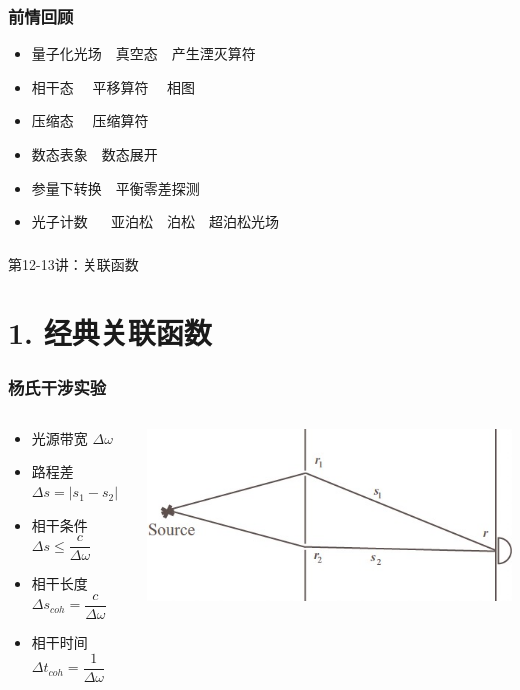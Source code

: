 \begin{frame}
    \frametitle{前情回顾}
    \begin{itemize}
        \item 量子化光场~~真空态~~产生湮灭算符 
        \item 相干态~~ 平移算符 ~~相图
        \item 压缩态~~ 压缩算符
        \item 数态表象~~数态展开
        \item 参量下转换~~平衡零差探测 
        \item 光子计数 ~~ 亚泊松~~泊松~~超泊松光场 
    \end{itemize}     
\end{frame}

\begin{frame} [plain]
    \frametitle{}
    \Background[1] 
    \begin{center}
    {\huge 第12-13讲：关联函数}
    \end{center}  
    \addtocounter{framenumber}{-1}   
\end{frame}

\section{1. 经典关联函数}
\begin{frame} 
    \frametitle{杨氏干涉实验}
    \begin{columns}
    \begin{column}[t]{0.4\linewidth}
    \begin{itemize}
        \item 光源带宽 $\Delta \omega $  
        \item 路程差 $\Delta s = |s_1 - s_2|$ 
        \item 相干条件 $\Delta s \le \dfrac{c}{\Delta \omega}$ 
        \item 相干长度 $\Delta s_{coh} = \dfrac{c}{\Delta \omega}$
        \item 相干时间 $\Delta t_{coh} = \dfrac{1}{\Delta \omega}$
    \end{itemize}
    \end{column}
    \begin{column}[t]{0.6\linewidth} 
        \begin{center}
        \includegraphics[width=1.0\textwidth]{figs/2022-06-02-14-02-17.png} 
        \end{center} 
        \end{column} 
        \end{columns} 
    \end{frame}

